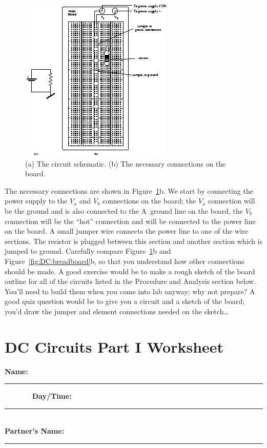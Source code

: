 \begin{figure}[!htb]
\centering \epsfysize=16cm \includegraphics[scale=4]{2_dc/exampleboard.eps} 
\caption{(a) The circuit schematic. (b) The necessary connections on the 
board.}
\label{fig:DC:exampleboard}
\end{figure}
The necessary connections are shown in Figure~\ref{fig:DC:exampleboard}b. We 
start by connecting the power supply to the $V_a$ and $V_b$ connections on the 
board; the $V_a$ connection will be the ground and is also connected to the
A~ground line on the board, the $V_b$ connection will be the ``hot'' connection
and will be connected to the power line on the board.  A small jumper wire
connects the power line to one of the wire sections.  The resistor is plugged
between this section and another section which is jumped to ground. Carefully
compare Figure~\ref{fig:DC:exampleboard}b and Figure~\ref{fig:DC:breadboard}b,
so that you understand how other connections should be made.  A good exercise
would be to make a rough sketch of the board outline for all of the circuits
listed in the Procedure and Analysis section below.  You'll need to build them
when you come into lab anyway; why not prepare? A good quiz question would be 
to give you a circuit and a sketch of the board; you'd draw the jumper and
element connections needed on the sketch\ldots 
\vfill
\pagebreak
$$
$$
\vfill
\clearpage
\newpage

\renewcommand{\thesection}{\thechapter.W1}

\section{DC Circuits Part I Worksheet}

{\bf \Large Name:}~ \rule{5cm}{.1mm}~~~~~~~
{\bf \Large Day/Time:}~\rule{3cm}{.1mm}\\
{\bf \Large Partner's Name:}~\rule{6cm}{.1mm}\\

